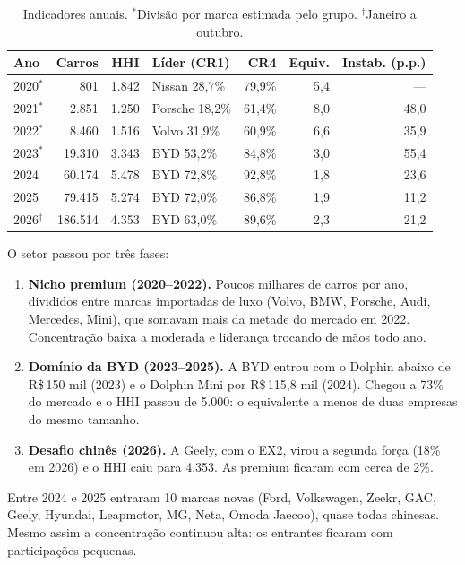 \documentclass[11pt,a4paper]{article}
\begin{document}
\begin{table}[H]
\centering\small
\begin{tabular}{@{}lrrlrrr@{}}
\toprule
Ano & Carros & HHI & Líder (CR1) & CR4 & Equiv. & Instab. (p.p.) \\
\midrule
2020$^*$ & 801    & 1.842 & Nissan 28,7\%  & 79,9\% & 5,4 & --- \\
2021$^*$ & 2.851  & 1.250 & Porsche 18,2\% & 61,4\% & 8,0 & 48,0 \\
2022$^*$ & 8.460  & 1.516 & Volvo 31,9\%   & 60,9\% & 6,6 & 35,9 \\
2023$^*$ & 19.310 & 3.343 & BYD 53,2\%     & 84,8\% & 3,0 & 55,4 \\
2024     & 60.174 & 5.478 & BYD 72,8\%     & 92,8\% & 1,8 & 23,6 \\
2025     & 79.415 & 5.274 & BYD 72,0\%     & 86,8\% & 1,9 & 11,2 \\
2026$^\dagger$ & 186.514 & 4.353 & BYD 63,0\% & 89,6\% & 2,3 & 21,2 \\
\bottomrule
\end{tabular}
\caption{Indicadores anuais. $^*$Divisão por marca estimada pelo grupo. $^\dagger$Janeiro a outubro.}
\end{table}

O setor passou por três fases:
\begin{enumerate}
  \item \textbf{Nicho premium (2020--2022).} Poucos milhares de carros por ano, divididos entre marcas importadas de luxo (Volvo, BMW, Porsche, Audi, Mercedes, Mini), que somavam mais da metade do mercado em 2022. Concentração baixa a moderada e liderança trocando de mãos todo ano.
  \item \textbf{Domínio da BYD (2023--2025).} A BYD entrou com o Dolphin abaixo de R\$\,150 mil (2023) e o Dolphin Mini por R\$\,115,8 mil (2024). Chegou a 73\% do mercado e o HHI passou de 5.000: o equivalente a menos de duas empresas do mesmo tamanho.
  \item \textbf{Desafio chinês (2026).} A Geely, com o EX2, virou a segunda força (18\% em 2026) e o HHI caiu para 4.353. As premium ficaram com cerca de 2\%.
\end{enumerate}

Entre 2024 e 2025 entraram 10 marcas novas (Ford, Volkswagen, Zeekr, GAC, Geely, Hyundai, Leapmotor, MG, Neta, Omoda Jaecoo), quase todas chinesas. Mesmo assim a concentração continuou alta: os entrantes ficaram com participações pequenas.

\end{document}
